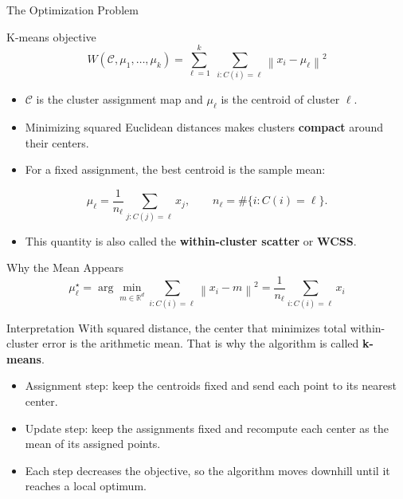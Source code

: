\documentclass[aspectratio=169,11pt]{beamer}
\begin{document}
\begin{frame}[t]{The Optimization Problem}
  \begin{block}{K-means objective}
    \[
      W(\mathcal C,\mu_1,\ldots,\mu_k)
      =
      \sum_{\ell=1}^{k}\;\sum_{i:C(i)=\ell}\left\lVert x_i-\mu_\ell\right\rVert^2
    \]
  \end{block}

  \begin{itemize}
    \item $\mathcal C$ is the cluster assignment map and $\mu_\ell$ is the centroid of cluster $\ell$.
    \item Minimizing squared Euclidean distances makes clusters \textbf{compact} around their centers.
    \item For a fixed assignment, the best centroid is the sample mean:
  \end{itemize}

  \[
    \mu_\ell
    =
    \frac{1}{n_\ell}\sum_{j:C(j)=\ell} x_j,
    \qquad
    n_\ell = \#\{i : C(i)=\ell\}.
  \]
  \begin{itemize}
    \item This quantity is also called the \textbf{within-cluster scatter} or \textbf{WCSS}.
  \end{itemize}
\end{frame}

\begin{frame}[t]{Why the Mean Appears}
  \[
    \mu_\ell^\star
    =
    \arg\min_{m \in \mathbb R^d}
    \sum_{i:C(i)=\ell}\left\lVert x_i-m\right\rVert^2
    =
    \frac{1}{n_\ell}\sum_{i:C(i)=\ell}x_i
  \]

  \vspace{-0.25em}
  \begin{block}{Interpretation}
    With squared distance, the center that minimizes total within-cluster error is the arithmetic mean. That is why the algorithm is called \textbf{k-means}.
  \end{block}

  \begin{itemize}
    \item Assignment step: keep the centroids fixed and send each point to its nearest center.
    \item Update step: keep the assignments fixed and recompute each center as the mean of its assigned points.
    \item Each step decreases the objective, so the algorithm moves downhill until it reaches a local optimum.
  \end{itemize}
\end{frame}
\end{document}
